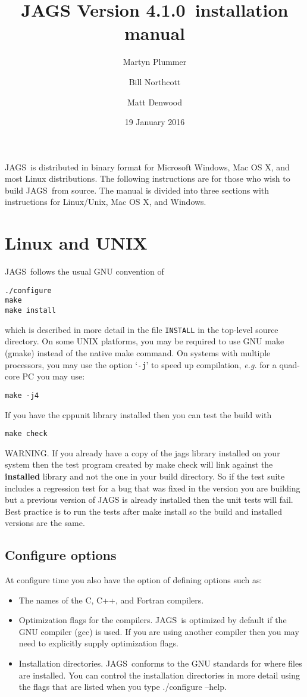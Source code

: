 \documentclass[11pt, a4paper, titlepage]{article}
\newcommand{\release}{4.1.0}
\newcommand{\JAGS}{\textsf{JAGS}}
\newcommand{\code}[1]{{\bgroup{\normalfont\ttfamily #1}\egroup}}
\newcommand{\samp}[1]{{`\bgroup\normalfont\texttt{#1}'\egroup}}
\let\command=\code
\let\option=\samp
\begin{document}
\title{JAGS Version \release\ installation manual}
\author{Martyn Plummer \and Bill Northcott \and Matt Denwood}
\date{19 January 2016}
\maketitle

\JAGS\ is distributed in binary format for Microsoft Windows, Mac OS
X, and most Linux distributions.  The following instructions are for
those who wish to build \JAGS\ from source. The manual is divided
into three sections with instructions for Linux/Unix, Mac OS X, and Windows.

\section{Linux and UNIX}

\JAGS\ follows the usual GNU convention of 
\begin{verbatim}
./configure
make
make install
\end{verbatim}
which is described in more detail in the file \texttt{INSTALL} in
the top-level source directory. On some UNIX platforms, you may
be required to use GNU make (gmake) instead of the native make
command. On systems with multiple processors, you may use the option 
\option{-j} to speed up compilation, {\em e.g.} for a quad-core PC you
may use:
\begin{verbatim}
make -j4
\end{verbatim}
If you have the cppunit library installed then you can test the build with
\begin{verbatim}
make check
\end{verbatim}
WARNING. If you already have a copy of the jags library installed on
your system then the test program created by \code{make check} will
link against the {\bf installed} library and not the one in your build
directory. So if the test suite includes a regression test for a bug
that was fixed in the version you are building but a previous version
of JAGS is already installed then the unit tests will fail. Best
practice is to run the tests after \code{make install} so the build
and installed versions are the same.

\subsection{Configure options}

At configure time you also have the option of defining options such
as:
\begin{itemize}
\item The names of the C, C++, and Fortran compilers.  
\item Optimization flags for the compilers.  \JAGS\ is optimized by
  default if the GNU compiler (gcc) is used. If you are using another
  compiler then you may need to explicitly supply optimization flags.
\item Installation directories. \JAGS\ conforms to the GNU standards
  for where files are installed. You can control the installation
  directories in more detail using the flags that are listed when
  you type \command{./configure --help}.
\end{itemize}
\end{document}
